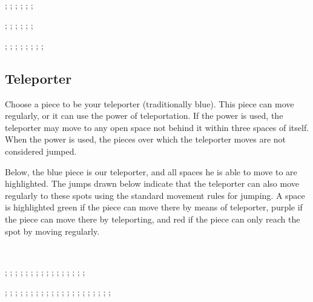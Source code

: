 \documentclass{article}
\begin{document}
\

\begin{center}
\begin{struggleboard}
  ;
  ;
  ;
  ;
  ;
  ;
\end{struggleboard}
\begin{struggleboard}
  ;
  ;
  ;
  ;
  ;
  ;
\end{struggleboard}
\begin{struggleboard}
  ;
  ;
  ;
  ;
  ;
  ;
  ;
  ;
\end{struggleboard}
\end{center}

\newpage

\subsection*{Teleporter}

Choose a piece to be your teleporter (traditionally blue).
This piece can move regularly, or it can use the power of teleportation.
If the power is used, the teleporter may move to any open space not behind it within three spaces of itself.
When the power is used, the pieces over which the teleporter moves are not considered jumped.

Below, the blue piece is our teleporter, and all spaces he is able to move to are highlighted. The jumps drawn below indicate that the teleporter can also move regularly to these spots using the standard movement rules for jumping. A space is highlighted green if the piece can move there by means of teleporter, purple if the piece can move there by teleporting, and red if the piece can only reach the spot by moving regularly.

\

\begin{center}
\begin{struggleboard}
  ;
  ;
  ;
  ;
  ;
  ;
  ;
  ;
  ;
  ;
  ;
  ;
  ;
  ;
  ;
  ;
\end{struggleboard}
\begin{struggleboard}
  ;
  ;
  ;
  ;
  ;
  ;
  ;
  ;
  ;
  ;
  ;
  ;
  ;
  ;
  ;
  ;
  ;
  ;
  ;
  ;
  ;
\end{struggleboard}
\end{center}
\end{document}
